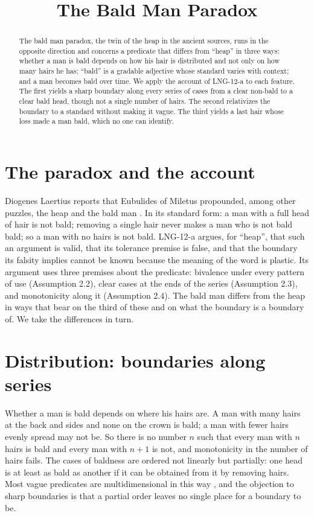 \documentclass{situationist-preprint}
\title{The Bald Man Paradox}
\begin{document}
\maketitle

\begin{abstract}
The bald man paradox, the twin of the heap in the ancient sources, runs in the opposite direction and concerns a predicate that differs from \enquote{heap} in three ways: whether a man is bald depends on how his hair is distributed and not only on how many hairs he has; \enquote{bald} is a gradable adjective whose standard varies with context; and a man becomes bald over time. We apply the account of LNG-12-a to each feature. The first yields a sharp boundary along every series of cases from a clear non-bald to a clear bald head, though not a single number of hairs. The second relativizes the boundary to a standard without making it vague. The third yields a last hair whose loss made a man bald, which no one can identify.
\end{abstract}

\section{The paradox and the account}

Diogenes Laertius reports that Eubulides of Miletus propounded, among other puzzles, the heap and the bald man \citep[II.108]{DiogenesLaertius}. In its standard form: a man with a full head of hair is not bald; removing a single hair never makes a man who is not bald bald; so a man with no hairs is not bald. LNG-12-a argues, for \enquote{heap}, that such an argument is valid, that its tolerance premise is false, and that the boundary its falsity implies cannot be known because the meaning of the word is plastic. Its argument uses three premises about the predicate: bivalence under every pattern of use (Assumption 2.2), clear cases at the ends of the series (Assumption 2.3), and monotonicity along it (Assumption 2.4). The bald man differs from the heap in ways that bear on the third of these and on what the boundary is a boundary of. We take the differences in turn.

\section{Distribution: boundaries along series}

Whether a man is bald depends on where his hairs are. A man with many hairs at the back and sides and none on the crown is bald; a man with fewer hairs evenly spread may not be. So there is no number $n$ such that every man with $n$ hairs is bald and every man with $n+1$ is not, and monotonicity in the number of hairs fails. The cases of baldness are ordered not linearly but partially: one head is at least as bald as another if it can be obtained from it by removing hairs. Most vague predicates are multidimensional in this way \citep{Keefe2000}, and the objection to sharp boundaries is that a partial order leaves no single place for a boundary to be.
\end{document}
